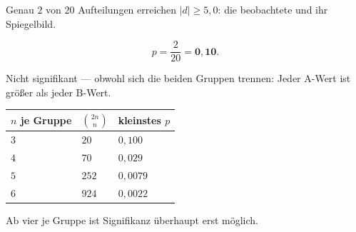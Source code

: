 \begin{aufgabe}
Genau $2$ von $20$ Aufteilungen erreichen $|d| \ge 5{,}0$: die beobachtete und ihr Spiegelbild.

\[ p = \frac{2}{20} = \mathbf{0{,}10} . \]

Nicht signifikant --- obwohl sich die beiden Gruppen  trennen: Jeder A-Wert ist größer als jeder B-Wert.

\begin{center}
\begin{minipage}{0.88\textwidth}
\end{minipage}
\end{center}

\begin{center}
\renewcommand{\arraystretch}{1.45}
\begin{tabular}{@{}P{2.0cm}P{2.0cm}P{2.6cm}@{}}
\toprule
$n$ je Gruppe & $\binom{2n}{n}$ & \textbf{kleinstes $p$}\\
\midrule
$3$ & $20$ & $0{,}100$\\
$4$ & $70$ & $0{,}029$\\
$5$ & $252$ & $0{,}0079$\\
$6$ & $924$ & $0{,}0022$\\
\bottomrule
\end{tabular}
\end{center}

Ab vier je Gruppe ist Signifikanz überhaupt erst möglich.
\end{aufgabe}

